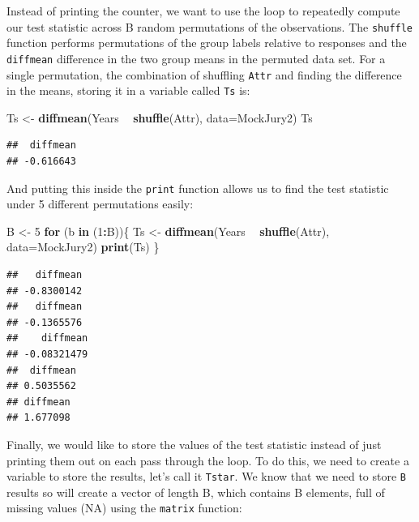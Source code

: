 \documentclass[]{book}
\newenvironment{Shaded}{\begin{snugshade}}{\end{snugshade}}
\newcommand{\KeywordTok}[1]{\textcolor[rgb]{0.13,0.29,0.53}{\textbf{#1}}}
\newcommand{\DataTypeTok}[1]{\textcolor[rgb]{0.13,0.29,0.53}{#1}}
\newcommand{\DecValTok}[1]{\textcolor[rgb]{0.00,0.00,0.81}{#1}}
\newcommand{\StringTok}[1]{\textcolor[rgb]{0.31,0.60,0.02}{#1}}
\newcommand{\ControlFlowTok}[1]{\textcolor[rgb]{0.13,0.29,0.53}{\textbf{#1}}}
\newcommand{\OperatorTok}[1]{\textcolor[rgb]{0.81,0.36,0.00}{\textbf{#1}}}
\newcommand{\NormalTok}[1]{#1}
\begin{document}
Instead of printing the counter, we want to use the loop to repeatedly
compute our test statistic across B random permutations of the
observations. The \texttt{shuffle} function performs permutations of the
group labels relative to responses and the \texttt{diffmean} difference
in the two group means in the permuted data set. For a single
permutation, the combination of shuffling \texttt{Attr} and finding the
difference in the means, storing it in a variable called \texttt{Ts} is:

\begin{Shaded}
\begin{Highlighting}[]
\NormalTok{Ts <-}\StringTok{ }\KeywordTok{diffmean}\NormalTok{(Years }\OperatorTok{~}\StringTok{ }\KeywordTok{shuffle}\NormalTok{(Attr), }\DataTypeTok{data=}\NormalTok{MockJury2)}
\NormalTok{Ts}
\end{Highlighting}
\end{Shaded}

\begin{verbatim}
##  diffmean 
## -0.616643
\end{verbatim}

And putting this inside the \texttt{print} function allows us to find
the test statistic under 5 different permutations easily:

\begin{Shaded}
\begin{Highlighting}[]
\NormalTok{B <-}\StringTok{ }\DecValTok{5}
\ControlFlowTok{for}\NormalTok{ (b }\ControlFlowTok{in}\NormalTok{ (}\DecValTok{1}\OperatorTok{:}\NormalTok{B))\{}
\NormalTok{  Ts <-}\StringTok{ }\KeywordTok{diffmean}\NormalTok{(Years }\OperatorTok{~}\StringTok{ }\KeywordTok{shuffle}\NormalTok{(Attr), }\DataTypeTok{data=}\NormalTok{MockJury2)}
  \KeywordTok{print}\NormalTok{(Ts)}
\NormalTok{\}}
\end{Highlighting}
\end{Shaded}

\begin{verbatim}
##   diffmean 
## -0.8300142 
##   diffmean 
## -0.1365576 
##    diffmean 
## -0.08321479 
##  diffmean 
## 0.5035562 
## diffmean 
## 1.677098
\end{verbatim}

Finally, we would like to store the values of the test statistic instead
of just printing them out on each pass through the loop. To do this, we
need to create a variable to store the results, let's call it
\texttt{Tstar}. We know that we need to store \texttt{B} results so will
create a vector of length B, which contains B elements, full of missing
values (NA) using the \texttt{matrix} function:
\end{document}
